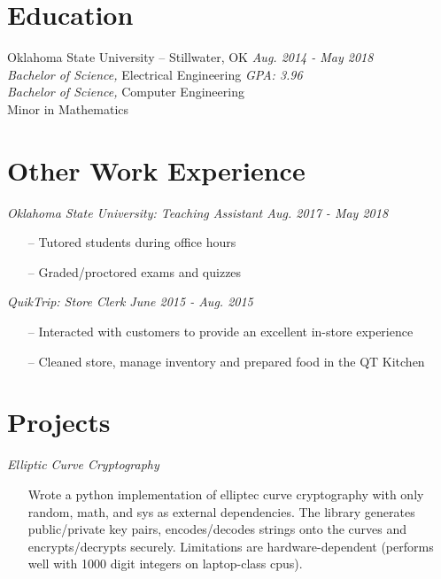 \documentclass[line,overlapped,9pt]{res}
\begin{document}
\begin{resume}
      \section{Education} Oklahoma State University -- Stillwater, OK \hfill {\sl Aug. 2014 - May 2018} \\
            {\sl Bachelor of Science,} Electrical Engineering \hfill {\sl GPA: 3.96}\\
            {\sl Bachelor of Science,} Computer Engineering \\
            Minor in Mathematics 
                
    \section{Other Work Experience}

            {\sl Oklahoma State University: Teaching Assistant \hfill Aug. 2017 - May 2018}
            \begin{itemize}  %
            \item[--] Tutored students during office hours 
            \item[--] Graded/proctored exams and quizzes
            \end{itemize} 

            {\sl QuikTrip: Store Clerk \hfill June 2015 - Aug. 2015}
            \begin{itemize} 
            \item[--] Interacted with customers to provide an excellent in-store experience 
            \item[--] Cleaned store, manage inventory and prepared food in the QT Kitchen 
            \end{itemize}

     \section{Projects}
             
            {\sl Elliptic Curve Cryptography} 
            \begin{itemize} 
            \item[] Wrote a python implementation of elliptec curve cryptography with only random, math, and sys
              as external dependencies. The library generates public/private key pairs, encodes/decodes strings
              onto the curves and encrypts/decrypts securely. Limitations are hardware-dependent (performs well
              with 1000 digit integers on laptop-class cpus). 
              \end{itemize}
       
\end{resume}
\end{document}
